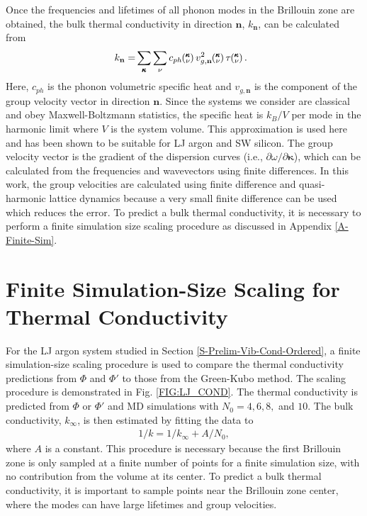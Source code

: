 \documentclass[letterpaper,12pt]{article}
\newcommand{\kv}{\mspace{-4.0mu}\left(\mspace{-8.0mu}\begin{smallmatrix}&\pmb{\kappa} \\&\nu\end{smallmatrix}\mspace{-3.0mu}\right)}
\begin{document}
Once the frequencies and lifetimes of all phonon modes in the
Brillouin zone are obtained, the bulk thermal conductivity in direction
$\mathbf{n}$, $k_{\mathbf{n}}$, can be calculated from \cite{ziman2001}
\begin{equation}\label{E-size:k_bulk}\
\begin{split}
k_{\mathbf{n}}=&\sum_{\pmb{\kappa}} \sum_\nu c_{ph} \kv v^{2}_{g,\mathbf{n}} \kv \tau \kv.
\end{split}
\end{equation}
Here, $c_{ph}$ is the phonon volumetric specific heat and ${v}_{g,\mathbf{n}}$ is
the component of the group velocity vector in direction $\mathbf{n}$. Since the systems we consider are classical and obey Maxwell-Boltzmann statistics,\cite{mcquarrie2000} the
specific heat is $k_{B}/V$ per mode in the harmonic limit where $V$ is the system volume. This approximation is used here and has been shown to be suitable for LJ argon\cite{mcgaughey2004c} and SW silicon.\cite{goicochea2010} The group
velocity vector is the gradient of the dispersion curves (i.e., $\partial \omega / \partial \pmb{\kappa}$), which can be calculated from the frequencies and wavevectors using finite differences. In this work, the group velocities are calculated using finite difference and quasi-harmonic lattice dynamics because a very small finite difference can be used which reduces the error.\cite{mcgaughey2006b} To predict a bulk thermal conductivity, it is necessary to perform a finite simulation size scaling procedure as discussed in Appendix \ref{A-Finite-Sim}.

\section{\label{A-Finite-Sim}Finite Simulation-Size Scaling for Thermal Conductivity}

For the LJ argon system studied in Section \ref{S-Prelim-Vib-Cond-Ordered}, a finite simulation-size scaling procedure\cite{turney2009a,He2011a} is used to compare the thermal conductivity predictions from $\Phi$ and $\Phi'$ to those from the Green-Kubo method. The scaling procedure is demonstrated in Fig$.$ \ref{FIG:LJ_COND}.  The thermal conductivity is predicted from $\Phi$ or $\Phi'$ and MD simulations with $N_0 = 4,6,8,$ and $10$. The bulk conductivity, $k_{\infty}$, is then estimated by fitting the data to
\begin{equation}\label{k_size}
\begin{split}
1/k = 1/k_{\infty} + A/N_0,
 \end{split}
\end{equation}
where $A$ is a constant. This procedure is necessary because the first Brillouin zone is only sampled at a finite number of points for a finite simulation size, with no contribution from the volume at its center. To predict a bulk thermal conductivity, it is important to sample points near the Brillouin zone center, where the modes can have large lifetimes and group velocities.\cite{turney2009a,sellan2010b} 
\end{document}
